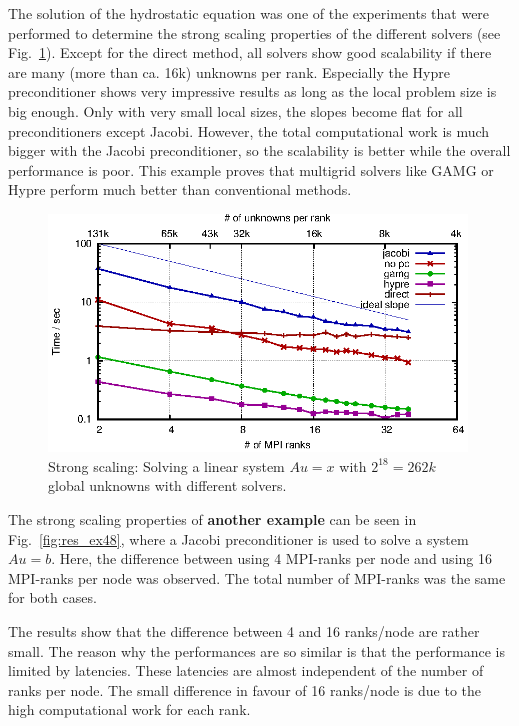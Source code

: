 The solution of the hydrostatic equation was one of the experiments that were performed to determine the strong scaling properties of the different solvers (see Fig.~\ref{fig:res_ex2_strong_time}). Except for the direct method, all solvers show good scalability if there are many (more than ca. 16k) unknowns per rank. Especially  the Hypre \cite{hypre-web-page} preconditioner shows very impressive results as long as the local problem size is big enough. Only with very small local sizes, the slopes become flat for all preconditioners except Jacobi. However, the total computational work is much bigger with the Jacobi preconditioner, so the scalability is better while the overall performance is poor. This example proves that multigrid solvers like GAMG or Hypre perform much better than conventional methods. 


\begin{figure}[tb]
	\centering
	\includegraphics[width=0.99\textwidth]{ex2_times}
	\caption{Strong scaling: Solving a linear system $Au = x$ with $2^{18} = 262k$ global unknowns with different solvers.} 
	\label{fig:res_ex2_strong_time}
\end{figure}

The strong scaling properties of \textbf{another example} can be seen in Fig.~\ref{fig:res_ex48}, where a Jacobi preconditioner is used to solve a system $Au = b$. Here, the difference between using 4 MPI-ranks per node and using 16 MPI-ranks per node was observed. The total number of MPI-ranks was the same for both cases.

The results show that the difference between 4 and 16 ranks/node are rather small. The reason why the performances are so similar is that the performance is limited by latencies. These latencies are almost independent of the number of ranks per node. The small difference in favour of 16 ranks/node is due to the high computational work for each rank.

